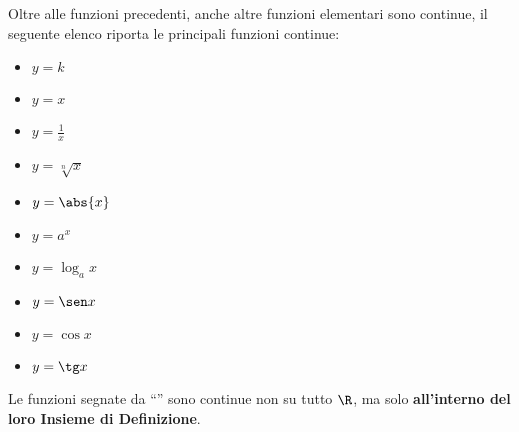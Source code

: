 \begin{comment}

\begin{teorema}[Continuità della funzione esponenziale]
La funzione esponenziale (\(y=a^x\)) è continua.
\end{teorema}

\noindent Ipotesi: \(f(x)=a^x\).\tab Tesi: \(f(x)\) è continua.

\affiancati{.49}{.49}{
\emph{Dimostrazione}
Usando la prima proprietà delle potenze:

\begin{align*}
f(x+\epsilon) &= 
a^{x+\epsilon} = a^{x} \cdot a^{\epsilon} = 
a^{x} \cdot \tonda{1 + \delta} = \\
&=a^{x} \cdot \tonda{1 + \delta} + a^x \cdot \delta \approx 
a^{x} = f(x) \qed
\end{align*}
}{
\begin{center} \continuitafesp \end{center}
}
\end{comment}




\noindent\begin{minipage}{\textwidth}
Oltre alle funzioni precedenti, anche altre funzioni elementari sono 
continue, il seguente elenco riporta le principali funzioni continue:

\noindent\begin{minipage}{1.05\textwidth}
\begin{multicols}{5}
\begin{itemize} [noitemsep]
 \item \(y=k\)
 \item \(y=x\)
 \item \(y=\frac{1}{x}\)  \textasteriskcentered
 \item \(y=\sqrt[n]{x}\)  \textasteriskcentered
 \item \(y=\abs{x}\)
 \item \(y=a^x\)
 \item \(y=\log_a x\)  \textasteriskcentered
 \item \(y=\sen x\)
 \item \(y=\cos x\)
 \item \(y=\tg x\)  \textasteriskcentered
\end{itemize}
\end{multicols}
\end{minipage}

\begin{osservazione}
Le funzioni segnate da ``\textasteriskcentered'' sono continue non su 
tutto \(\R\), 
ma solo \textbf{all'interno del loro Insieme di Definizione}.
\end{osservazione}
\end{minipage}

